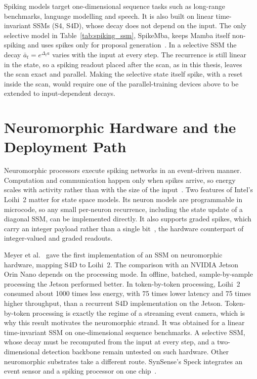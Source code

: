 \documentclass[11pt, a4paper]{report}
\begin{document}
Spiking models target one-dimensional sequence tasks such as long-range benchmarks, language modelling and speech. It is also built on linear time-invariant SSMs (S4, S4D), whose
decay does not depend on the input. The only selective model in Table~\ref{tab:spiking_ssm}, SpikeMba, keeps
Mamba itself non-spiking and uses spikes only for proposal generation~\cite{li2024spikemba}. In a selective
SSM the decay $\bar a_t = e^{\Delta_t a}$ varies with the input at every step. The recurrence is still linear
in the state, so a spiking readout placed after the scan, as in this thesis, leaves the scan exact and parallel. Making the selective state itself spike, with a reset inside the scan, would require one of the
parallel-training devices above to be extended to input-dependent decays.

\section{Neuromorphic Hardware and the Deployment Path}
\label{sec:neuromorphic_hw}
Neuromorphic processors execute spiking networks in an event-driven manner. Computation and communication happen only when spikes arrive, so energy scales with activity rather than with the size of
the input~\cite{davies2021advancing}. Two features of Intel's Loihi~2 matter for state space models.
Its neuron models are programmable in microcode, so any small
per-neuron recurrence, including the state update of a diagonal SSM, can be implemented directly. It also
supports graded spikes, which carry an integer payload rather than a single bit~\cite{orchard2021efficient},
the hardware counterpart of integer-valued and graded readouts.

Meyer et al.~\cite{meyer2024diagonal} gave the first implementation of an SSM on neuromorphic hardware,
mapping S4D to Loihi~2. The comparison with an NVIDIA Jetson Orin Nano depends on the processing mode. In
offline, batched, sample-by-sample processing the Jetson performed better. In token-by-token processing,
Loihi~2 consumed about 1000 times less energy, with 75 times lower latency and 75 times higher throughput,
than a recurrent S4D implementation on the Jetson. Token-by-token processing is exactly the regime of a
streaming event camera, which is why this result motivates the neuromorphic strand. It was obtained for a
linear time-invariant SSM on one-dimensional sequence benchmarks. A selective SSM, whose decay must be
recomputed from the input at every step, and a two-dimensional detection backbone remain untested on such
hardware. Other neuromorphic substrates take a different route. SynSense's Speck integrates an event sensor
and a spiking processor on one chip~\cite{synsense2026speck}.
\end{document}

